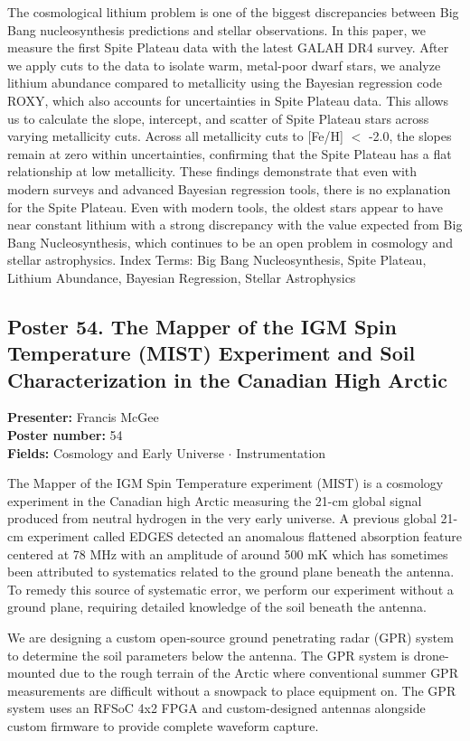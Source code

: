 The cosmological lithium problem is one of the biggest discrepancies between Big Bang nucleosynthesis predictions and stellar observations. In this paper, we measure the first Spite Plateau data with the latest GALAH DR4 survey. After we apply cuts to the data to isolate warm, metal-poor dwarf stars, we analyze lithium abundance compared to metallicity using the Bayesian regression code ROXY, which also accounts for uncertainties in Spite Plateau data. This allows us to calculate the slope, intercept, and scatter of Spite Plateau stars across varying metallicity cuts. Across all metallicity cuts to [Fe/H] $<$ -2.0, the slopes remain at zero within uncertainties, confirming that the Spite Plateau has a flat relationship at low metallicity. These findings demonstrate that even with modern surveys and advanced Bayesian regression tools, there is no explanation for the Spite Plateau. Even with modern tools, the oldest stars appear to have near constant lithium with a strong discrepancy with the value expected from Big Bang Nucleosynthesis, which continues to be an open problem in cosmology and stellar astrophysics. Index Terms: Big Bang Nucleosynthesis, Spite Plateau, Lithium Abundance, Bayesian Regression, Stellar Astrophysics

\hypertarget{poster-abstract-talk-214}{}\label{poster-abstract-page-talk-214}
\subsection*{Poster 54. The Mapper of the IGM Spin Temperature (MIST) Experiment and Soil Characterization in the Canadian High Arctic}
\textbf{Presenter:} Francis McGee\\
\textbf{Poster number:} 54\\
\textbf{Fields:} Cosmology and Early Universe $\cdot$ Instrumentation

The Mapper of the IGM Spin Temperature experiment (MIST) is a cosmology experiment in the Canadian high Arctic measuring the 21-cm global signal produced from neutral hydrogen in the very early universe. A previous global 21-cm experiment called EDGES detected an anomalous flattened absorption feature centered at 78 MHz with an amplitude of around 500 mK which has sometimes been attributed to systematics related to the ground plane beneath the antenna. To remedy this source of systematic error, we perform our experiment without a ground plane, requiring detailed knowledge of the soil beneath the antenna.

We are designing a custom open-source ground penetrating radar (GPR) system to determine the soil parameters below the antenna. The GPR system is drone-mounted due to the rough terrain of the Arctic where conventional summer GPR measurements are difficult without a snowpack to place equipment on. The GPR system uses an RFSoC 4x2 FPGA and custom-designed antennas alongside custom firmware to provide complete waveform capture.

